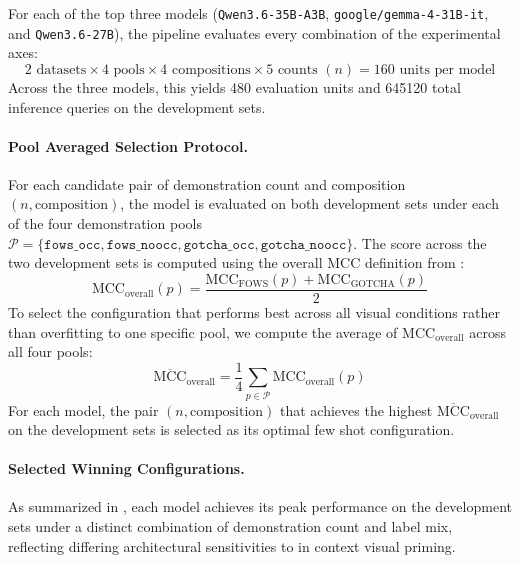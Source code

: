 For each of the top three models (\texttt{Qwen3.6-35B-A3B}, \texttt{google/gemma-4-31B-it}, and \texttt{Qwen3.6-27B}), the pipeline evaluates every combination of the experimental axes:
\begin{equation}
    2 \text{ datasets} \times 4 \text{ pools} \times 4 \text{ compositions} \times 5 \text{ counts } (n) = 160 \text{ units per model}
\end{equation}
Across the three models, this yields 480 evaluation units and \num{645120} total inference queries on the development sets.

\paragraph{Pool Averaged Selection Protocol.}
For each candidate pair of demonstration count and composition $(n, \text{composition})$, the model is evaluated on both development sets under each of the four demonstration pools $\mathcal{P} = \{\texttt{fows\_occ}, \texttt{fows\_noocc}, \texttt{gotcha\_occ}, \texttt{gotcha\_noocc}\}$. The score across the two development sets is computed using the overall MCC definition from :
\begin{equation}
    \text{MCC}_{\text{overall}}(p) = \frac{\text{MCC}_{\text{FOWS}}(p) + \text{MCC}_{\text{GOTCHA}}(p)}{2}
\end{equation}
To select the configuration that performs best across all visual conditions rather than overfitting to one specific pool, we compute the average of $\text{MCC}_{\text{overall}}$ across all four pools:
\begin{equation}
    \overline{\text{MCC}}_{\text{overall}} = \frac{1}{4} \sum_{p \in \mathcal{P}} \text{MCC}_{\text{overall}}(p)
\end{equation}
For each model, the pair $(n, \text{composition})$ that achieves the highest $\overline{\text{MCC}}_{\text{overall}}$ on the development sets is selected as its optimal few shot configuration.

\paragraph{Selected Winning Configurations.}
As summarized in , each model achieves its peak performance on the development sets under a distinct combination of demonstration count and label mix, reflecting differing architectural sensitivities to in context visual priming.

